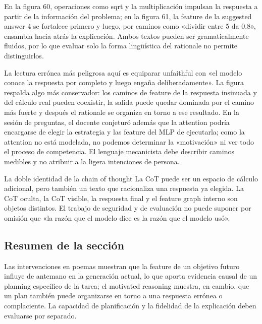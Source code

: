 
En la figura 60, operaciones como sqrt y la multiplicación impulsan la respuesta a partir de la información del problema; en la figura 61, la feature de la suggested answer 4 se fortalece primero y luego, por caminos como «dividir entre 5 da 0.8», ensambla hacia atrás la explicación. Ambos textos pueden ser gramaticalmente fluidos, por lo que evaluar solo la forma lingüística del rationale no permite distinguirlos.

La lectura errónea más peligrosa aquí es equiparar unfaithful con «el modelo conoce la respuesta por completo y luego engaña deliberadamente». La figura respalda algo más conservador: los caminos de feature de la respuesta insinuada y del cálculo real pueden coexistir, la salida puede quedar dominada por el camino más fuerte y después el rationale se organiza en torno a ese resultado. En la sesión de preguntas, el docente conjeturó además que la attention podría encargarse de elegir la estrategia y las feature del MLP de ejecutarla; como la attention no está modelada, no podemos determinar la «motivación» ni ver todo el proceso de competencia. El lenguaje mecanicista debe describir caminos medibles y no atribuir a la ligera intenciones de persona.

\begin{warningbox}{La doble identidad de la chain of thought}
La CoT puede ser un espacio de cálculo adicional, pero también un texto que racionaliza una respuesta ya elegida. La CoT oculta, la CoT visible, la respuesta final y el feature graph interno son objetos distintos. El trabajo de seguridad y de evaluación no puede suponer por omisión que «la razón que el modelo dice es la razón que el modelo usó».
\end{warningbox}


\subsection{Resumen de la sección}

Las intervenciones en poemas muestran que la feature de un objetivo futuro influye de antemano en la generación actual, lo que aporta evidencia causal de un planning específico de la tarea; el motivated reasoning muestra, en cambio, que un plan también puede organizarse en torno a una respuesta errónea o complaciente. La capacidad de planificación y la fidelidad de la explicación deben evaluarse por separado.
